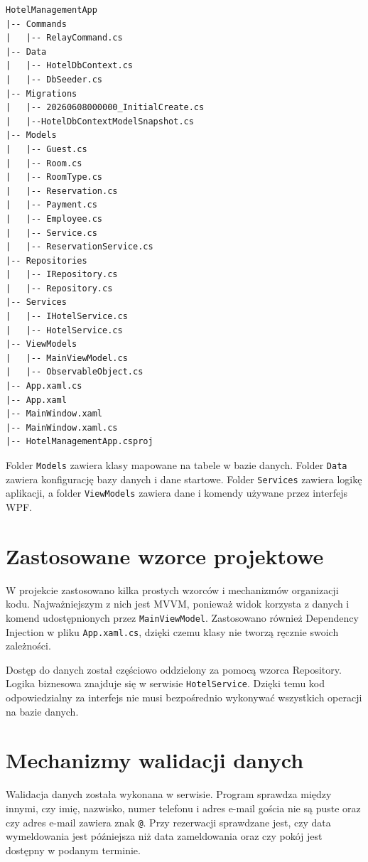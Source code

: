 \begin{lstlisting}[style=textStyle,caption={Uproszczona struktura folderów projektu},label={lst:struktura}]
HotelManagementApp
|-- Commands
|   |-- RelayCommand.cs
|-- Data
|   |-- HotelDbContext.cs
|   |-- DbSeeder.cs
|-- Migrations
|   |-- 20260608000000_InitialCreate.cs
|   |--HotelDbContextModelSnapshot.cs
|-- Models
|   |-- Guest.cs
|   |-- Room.cs
|   |-- RoomType.cs
|   |-- Reservation.cs
|   |-- Payment.cs
|   |-- Employee.cs
|   |-- Service.cs
|   |-- ReservationService.cs
|-- Repositories
|   |-- IRepository.cs
|   |-- Repository.cs
|-- Services
|   |-- IHotelService.cs
|   |-- HotelService.cs
|-- ViewModels
|   |-- MainViewModel.cs
|   |-- ObservableObject.cs
|-- App.xaml.cs
|-- App.xaml
|-- MainWindow.xaml
|-- MainWindow.xaml.cs
|-- HotelManagementApp.csproj
\end{lstlisting}

Folder \texttt{Models} zawiera klasy mapowane na tabele w bazie danych. Folder \texttt{Data} zawiera konfigurację bazy danych i dane startowe. Folder \texttt{Services} zawiera logikę aplikacji, a folder \texttt{ViewModels} zawiera dane i komendy używane przez interfejs WPF.

\section{Zastosowane wzorce projektowe}

W projekcie zastosowano kilka prostych wzorców i mechanizmów organizacji kodu. Najważniejszym z nich jest MVVM, ponieważ widok korzysta z danych i komend udostępnionych przez \texttt{MainViewModel}. Zastosowano również Dependency Injection w pliku \texttt{App.xaml.cs}, dzięki czemu klasy nie tworzą ręcznie swoich zależności.

Dostęp do danych został częściowo oddzielony za pomocą wzorca Repository. Logika biznesowa znajduje się w serwisie \texttt{HotelService}. Dzięki temu kod odpowiedzialny za interfejs nie musi bezpośrednio wykonywać wszystkich operacji na bazie danych.

\section{Mechanizmy walidacji danych}

Walidacja danych została wykonana w serwisie. Program sprawdza między innymi, czy imię, nazwisko, numer telefonu i adres e-mail gościa nie są puste oraz czy adres e-mail zawiera znak \texttt{@}. Przy rezerwacji sprawdzane jest, czy data wymeldowania jest późniejsza niż data zameldowania oraz czy pokój jest dostępny w podanym terminie.

